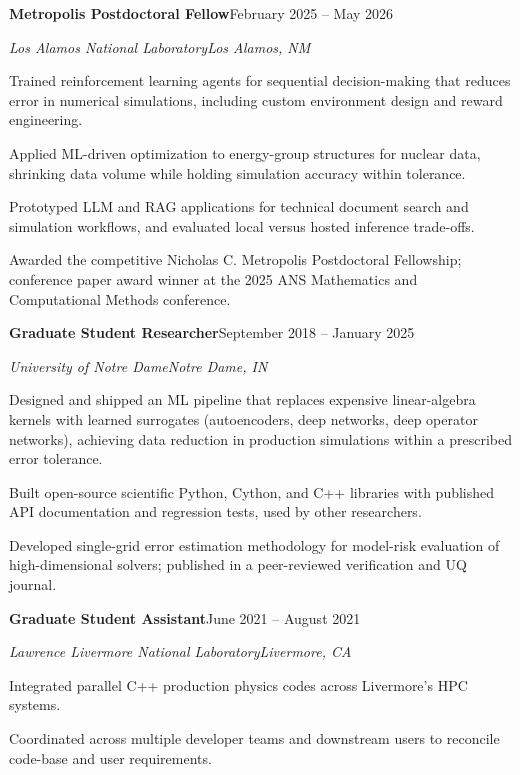 \documentclass[10.5pt,letterpaper]{article}
\newcommand{\role}[4]{%
  \vspace{3pt}%
  \noindent\textbf{#1}\hfill\textcolor{muted}{#2}\par
  \noindent\textit{#3}\hfill\textcolor{muted}{\textit{#4}}\par
  \vspace{1pt}%
}
\begin{document}
\role{Metropolis Postdoctoral Fellow}{February 2025 -- May 2026}{Los Alamos National Laboratory}{Los Alamos, NM}
\begin{tight}
  \item Trained reinforcement learning agents for sequential decision-making that reduces error
    in numerical simulations, including custom environment design and reward engineering.
  \item Applied ML-driven optimization to energy-group structures for nuclear data, shrinking
    data volume while holding simulation accuracy within tolerance.
  \item Prototyped LLM and RAG applications for technical document search and simulation
    workflows, and evaluated local versus hosted inference trade-offs.
  \item Awarded the competitive Nicholas C. Metropolis Postdoctoral Fellowship; conference paper
    award winner at the 2025 ANS Mathematics and Computational Methods conference.
\end{tight}

\role{Graduate Student Researcher}{September 2018 -- January 2025}{University of Notre Dame}{Notre Dame, IN}
\begin{tight}
  \item Designed and shipped an ML pipeline that replaces expensive linear-algebra kernels with
    learned surrogates (autoencoders, deep networks, deep operator networks), achieving data
    reduction in production simulations within a prescribed error tolerance.
  \item Built open-source scientific Python, Cython, and C++ libraries with published API
    documentation and regression tests, used by other researchers.
  \item Developed single-grid error estimation methodology for model-risk evaluation of
    high-dimensional solvers; published in a peer-reviewed verification and UQ journal.
\end{tight}

\role{Graduate Student Assistant}{June 2021 -- August 2021}{Lawrence Livermore National Laboratory}{Livermore, CA}
\begin{tight}
  \item Integrated parallel C++ production physics codes across Livermore's HPC systems.
  \item Coordinated across multiple developer teams and downstream users to reconcile
    code-base and user requirements.
\end{tight}
\end{document}

